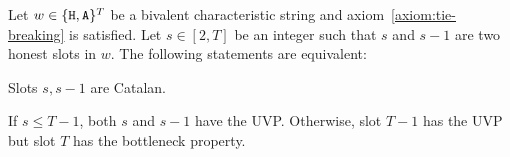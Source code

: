   \begin{theorem}\label{thm:multiple-honest}
    Let $w \in \{\mathtt{H}, \mathtt{A}\}^T$ be a bivalent characteristic string 
    and axiom~\ref{axiom:tie-breaking} is satisfied.
    Let $s \in[2, T]$ be an integer such that 
    $s$ and $s - 1$ are two honest slots in $w$. 
    The following statements are equivalent:
    \begin{enumerate*}[label=(\textit{\roman*})]
      \item\label{thm:part-catalan-multiple-honest} 
      Slots $s, s - 1$ are Catalan.

      \item\label{thm:part-cp-multiple-honest} 
      If $s \leq T - 1$, both $s$ and $s - 1$ have the UVP. 
      Otherwise, slot $T - 1$ has the UVP but 
      slot $T$ has the bottleneck property.

    \end{enumerate*}
  \end{theorem}
